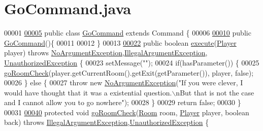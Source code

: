\hypertarget{GoCommand_8java_source}{\section{Go\-Command.\-java}
}

\begin{DoxyCode}
00001 
\hypertarget{GoCommand_8java_source_l00005}{}\hyperlink{classGoCommand}{00005} \textcolor{keyword}{public} \textcolor{keyword}{class }\hyperlink{classGoCommand}{GoCommand} \textcolor{keyword}{extends} Command \{
00006 
\hypertarget{GoCommand_8java_source_l00010}{}\hyperlink{classGoCommand_a30d6bd5c2284b97e76ebe702e1cb1d55}{00010}     \textcolor{keyword}{public} \hyperlink{classGoCommand_a30d6bd5c2284b97e76ebe702e1cb1d55}{GoCommand}()\{
00011 
00012     \}
00013 
\hypertarget{GoCommand_8java_source_l00022}{}\hyperlink{classGoCommand_a77a61c2a3b89dca45b51e06f3bcb3ba7}{00022}     \textcolor{keyword}{public} \textcolor{keywordtype}{boolean} \hyperlink{classGoCommand_a77a61c2a3b89dca45b51e06f3bcb3ba7}{execute}(\hyperlink{classPlayer}{Player} player) \textcolor{keywordflow}{throws} 
      \hyperlink{classNoArgumentException}{NoArgumentException},\hyperlink{classIllegalArgumentException}{IllegalArgumentException},
      \hyperlink{classUnauthorizedException}{UnauthorizedException} \{
00023         setMessage(\textcolor{stringliteral}{""});
00024         \textcolor{keywordflow}{if}(hasParameter()) \{
00025             \hyperlink{classGoCommand_a1fce2ad8ed1faf41fa300064585b3616}{goRoomCheck}(player.getCurrentRoom().getExit(getParameter()), player, \textcolor{keyword}{false});
00026         \} \textcolor{keywordflow}{else} \{
00027             \textcolor{keywordflow}{throw} \textcolor{keyword}{new} \hyperlink{classNoArgumentException}{NoArgumentException}(\textcolor{stringliteral}{"If you were clever, I would have thought that
       it was a existential question.\(\backslash\)nBut that is not the case and I cannot allow you to go nowhere"});
00028         \}
00029         \textcolor{keywordflow}{return} \textcolor{keyword}{false};
00030     \}
00031 
\hypertarget{GoCommand_8java_source_l00040}{}\hyperlink{classGoCommand_a1fce2ad8ed1faf41fa300064585b3616}{00040}     \textcolor{keyword}{protected} \textcolor{keywordtype}{void} \hyperlink{classGoCommand_a1fce2ad8ed1faf41fa300064585b3616}{goRoomCheck}(\hyperlink{classRoom}{Room} room, \hyperlink{classPlayer}{Player} player, \textcolor{keywordtype}{boolean} back) \textcolor{keywordflow}{throws} 
      \hyperlink{classIllegalArgumentException}{IllegalArgumentException},\hyperlink{classUnauthorizedException}{UnauthorizedException} \{

\end{DoxyCode}
